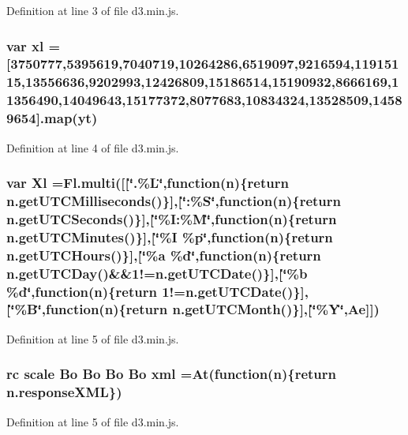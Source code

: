 Definition at line 3 of file d3.\+min.\+js.

\subsubsection[{xl}]{\setlength{\rightskip}{0pt plus 5cm}var xl =[3750777,5395619,7040719,10264286,6519097,9216594,11915115,13556636,9202993,12426809,15186514,15190932,8666169,11356490,14049643,15177372,8077683,10834324,13528509,14589654].{\bf map}(yt)}\label{d3_8min_8js_aac1650e57cbee53ac294fd22ba078e00}


Definition at line 4 of file d3.\+min.\+js.

\subsubsection[{Xl}]{\setlength{\rightskip}{0pt plus 5cm}var Xl =Fl.\+multi([[\char`\"{}.\%L\char`\"{},function({\bf n})\{{\bf return} n.\+get\+U\+T\+C\+Milliseconds()\}],[\char`\"{}\+:\%S\char`\"{},function({\bf n})\{{\bf return} n.\+get\+U\+T\+C\+Seconds()\}],[\char`\"{}\%I\+:\%M\char`\"{},function({\bf n})\{{\bf return} n.\+get\+U\+T\+C\+Minutes()\}],[\char`\"{}\%I \%p\char`\"{},function({\bf n})\{{\bf return} n.\+get\+U\+T\+C\+Hours()\}],[\char`\"{}\%a \%{\bf d}\char`\"{},function({\bf n})\{{\bf return} n.\+get\+U\+T\+C\+Day()\&\&1!=n.\+get\+U\+T\+C\+Date()\}],[\char`\"{}\%b \%{\bf d}\char`\"{},function({\bf n})\{{\bf return} 1!=n.\+get\+U\+T\+C\+Date()\}],[\char`\"{}\%B\char`\"{},function({\bf n})\{{\bf return} n.\+get\+U\+T\+C\+Month()\}],[\char`\"{}\%Y\char`\"{},Ae]])}\label{d3_8min_8js_a3729c94578a792a66db05d5172e04e35}


Definition at line 5 of file d3.\+min.\+js.

\subsubsection[{xml}]{ {\bf rc} {\bf scale} {\bf Bo} {\bf Bo} {\bf Bo} {\bf Bo} xml =At(function({\bf n})\{{\bf return} n.\+response\+X\+M\+L\})}\label{d3_8min_8js_a4ffa93ad694633f155f12c99bf7de090}


Definition at line 5 of file d3.\+min.\+js.

